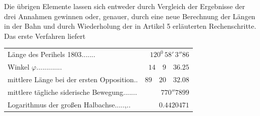 Die übrigen Elemente lassen sich entweder durch Vergleich der Ergebnisse der drei Annahmen gewinnen oder, genauer, durch eine neue Berechnung der Längen in der Bahn und durch Wiederholung der in Artikel 5 erläuterten Rechenschritte. Das erste Verfahren liefert
\begin{center}\fontsize{9}{11}\selectfont
\begin{tabular}{@{}p{.69\linewidth}@{\quad}r@{}}
Länge des Perihels 1803\hfill\mbox{.\hspace{.76em}.\hspace{.76em}.\hspace{.76em}.\hspace{.76em}.\hspace{.76em}.\hspace{.76em}.}&$120^0\,58'\,3''86$\\
Winkel $\varphi$\hfill\mbox{.\hspace{.76em}.\hspace{.76em}.\hspace{.76em}.\hspace{.76em}.\hspace{.76em}.\hspace{.76em}.\hspace{.76em}.\hspace{.76em}.\hspace{.76em}.\hspace{.76em}.\hspace{.76em}.\hspace{.76em}.}&$14\quad9\quad36.25$\\
mittlere Länge bei der ersten Opposition\hfill\mbox{.\hspace{.76em}.}&$89\quad20\quad32.08$\\
mittlere tägliche siderische Bewegung\hfill\mbox{.\hspace{.76em}.\hspace{.76em}.\hspace{.76em}.\hspace{.76em}.\hspace{.76em}.\hspace{.76em}.}&$770''7899$\\
Logarithmus der großen Halbachse.\hfill\mbox{.\hspace{.76em}.\hspace{.76em}.\hspace{.76em}.\hspace{.76em},\hspace{.76em}.\hspace{.76em}.}&$0.4420471$
\end{tabular}
\end{center}
